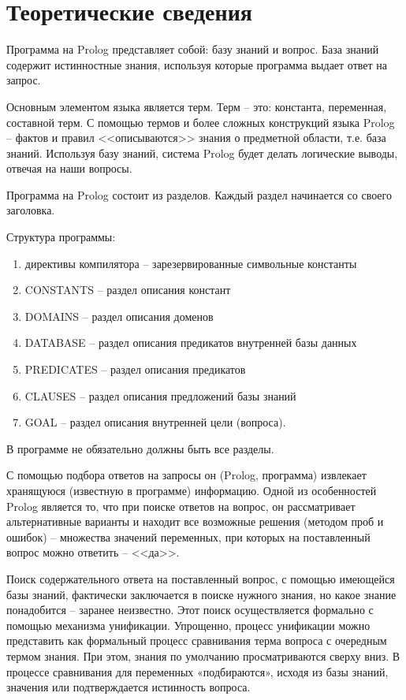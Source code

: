 \chapter{Теоретические сведения}

Программа на Prolog представляет собой: базу знаний и вопрос. База знаний содержит истинностные знания, используя которые программа выдает ответ на запрос.

Основным элементом языка является терм. Терм – это: константа, переменная, составной терм. С помощью термов и более сложных конструкций языка Prolog – фактов и правил <<описываются>> знания о предметной области, т.е. база знаний. Используя базу знаний, система Prolog будет делать логические выводы, отвечая на наши вопросы.

Программа на Prolog состоит из разделов. Каждый раздел начинается со своего заголовка.

Структура программы:
\begin{enumerate}
\item директивы компилятора -- зарезервированные символьные константы
\item CONSTANTS -- раздел описания констант
\item DOMAINS -- раздел описания доменов
\item DATABASE -- раздел описания предикатов внутренней базы данных
\item PREDICATES -- раздел описания предикатов
\item CLAUSES -- раздел описания предложений базы знаний
\item GOAL -- раздел описания внутренней цели (вопроса).
\end{enumerate}

В программе не обязательно должны быть все разделы.

С помощью подбора ответов на запросы он (Prolog, программа) извлекает хранящуюся (известную в программе) информацию. Одной из особенностей Prolog является то, что при поиске ответов на вопрос, он рассматривает альтернативные варианты и находит все возможные решения (методом проб и ошибок) -- множества значений переменных, при которых на поставленный вопрос можно ответить -- <<да>>.

Поиск содержательного ответа на поставленный вопрос, с помощью имеющейся базы знаний, фактически заключается в поиске нужного знания, но какое знание понадобится – заранее неизвестно. Этот поиск осуществляется формально с помощью механизма унификации. Упрощенно, процесс унификации можно представить как формальный процесс сравнивания терма вопроса с очередным термом знания. При этом, знания по умолчанию просматриваются сверху вниз. В процессе сравнивания для переменных «подбираются», исходя из базы знаний, значения или подтверждается истинность вопроса.

